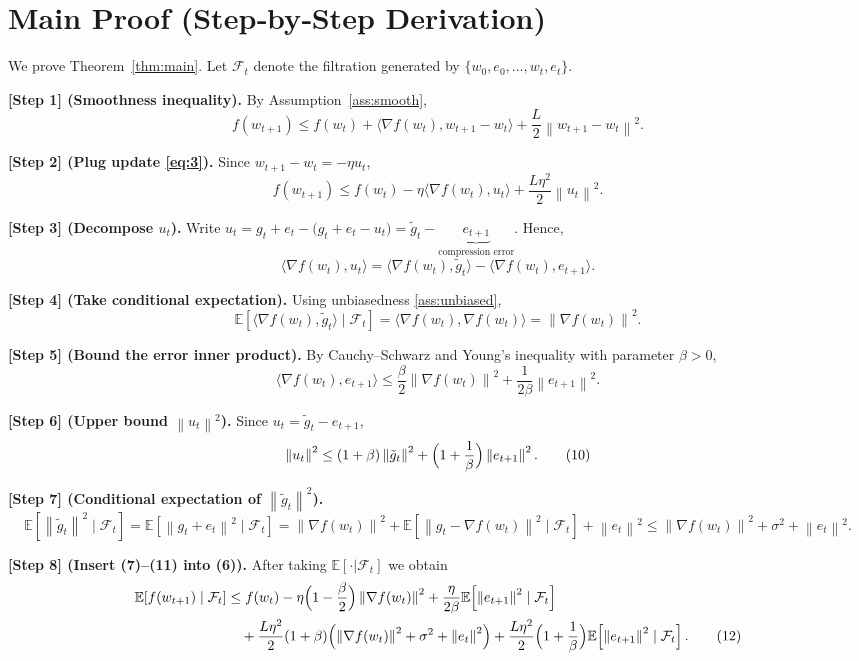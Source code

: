\documentclass{article}
\newcommand{\E}{\mathbb{E}}
\newcommand{\norm}[1]{\left\|#1\right\|}
\begin{document}
\section*{Main Proof (Step‑by‑Step Derivation)}
We prove Theorem~\ref{thm:main}. Let $\mathcal{F}_{t}$ denote the filtration generated by $\{w_{0},e_{0},\dots,w_{t},e_{t}\}$.

\noindent\textbf{[Step 1] (Smoothness inequality).} By Assumption~\ref{ass:smooth},
\[
f(w_{t+1})\le f(w_{t})+\langle\nabla f(w_{t}),w_{t+1}-w_{t}\rangle+\frac{L}{2}\norm{w_{t+1}-w_{t}}^{2}. \tag{5}
\]

\noindent\textbf{[Step 2] (Plug update \eqref{eq:3}).} Since $w_{t+1}-w_{t}=-\eta u_{t}$,
\[
f(w_{t+1})\le f(w_{t})-\eta\langle\nabla f(w_{t}),u_{t}\rangle+\frac{L\eta^{2}}{2}\norm{u_{t}}^{2}. \tag{6}
\]

\noindent\textbf{[Step 3] (Decompose $u_{t}$).} Write $u_{t}=g_{t}+e_{t}-\bigl(g_{t}+e_{t}-u_{t}\bigr)=\tilde g_{t}-\underbrace{e_{t+1}}_{\text{compression error}}$.
Hence,
\[
\langle\nabla f(w_{t}),u_{t}\rangle
= \langle\nabla f(w_{t}),\tilde g_{t}\rangle-\langle\nabla f(w_{t}),e_{t+1}\rangle.
\tag{7}
\]

\noindent\textbf{[Step 4] (Take conditional expectation).} Using unbiasedness \eqref{ass:unbiased},
\[
\E\!\left[\langle\nabla f(w_{t}),\tilde g_{t}\rangle\mid\mathcal{F}_{t}\right]
= \langle\nabla f(w_{t}),\nabla f(w_{t})\rangle
= \norm{\nabla f(w_{t})}^{2}. \tag{8}
\]

\noindent\textbf{[Step 5] (Bound the error inner product).} By Cauchy–Schwarz and Young’s inequality with parameter $\beta>0$,
\[
\langle\nabla f(w_{t}),e_{t+1}\rangle\le \frac{\beta}{2}\norm{\nabla f(w_{t})}^{2}
+\frac{1}{2\beta}\norm{e_{t+1}}^{2}. \tag{9}
\]

\noindent\textbf{[Step 6] (Upper bound $\norm{u_{t}}^{2}$).} Since $u_{t}=\tilde g_{t}-e_{t+1}$,
\[
\norm{u_{t}}^{2}\le (1+\beta)\norm{\tilde g_{t}}^{2}+\Bigl(1+\frac{1}{\beta}\Bigr)\norm{e_{t+1}}^{2}. \tag{10}
\]

\noindent\textbf{[Step 7] (Conditional expectation of $\norm{\tilde g_{t}}^{2}$).}
\[
\E\!\left[\norm{\tilde g_{t}}^{2}\mid\mathcal{F}_{t}\right]
= \E\!\left[\norm{g_{t}+e_{t}}^{2}\mid\mathcal{F}_{t}\right]
= \norm{\nabla f(w_{t})}^{2}+\E\!\left[\norm{g_{t}-\nabla f(w_{t})}^{2}\mid\mathcal{F}_{t}\right]
+\norm{e_{t}}^{2}
\le \norm{\nabla f(w_{t})}^{2}+\sigma^{2}+\norm{e_{t}}^{2}. \tag{11}
\]

\noindent\textbf{[Step 8] (Insert (7)–(11) into (6)).} After taking $\E[\cdot|\mathcal{F}_{t}]$ we obtain
\begin{align}
\E\!\left[f(w_{t+1})\mid\mathcal{F}_{t}\right]
&\le f(w_{t})-\eta\Bigl(1-\frac{\beta}{2}\Bigr)\norm{\nabla f(w_{t})}^{2}
+\frac{\eta}{2\beta}\E\!\left[\norm{e_{t+1}}^{2}\mid\mathcal{F}_{t}\right]\nonumber\\
&\quad+\frac{L\eta^{2}}{2}(1+\beta)\Bigl(\norm{\nabla f(w_{t})}^{2}+\sigma^{2}+\norm{e_{t}}^{2}\Bigr)
+\frac{L\eta^{2}}{2}\Bigl(1+\frac{1}{\beta}\Bigr)\E\!\left[\norm{e_{t+1}}^{2}\mid\mathcal{F}_{t}\right].
\tag{12}
\end{align}
\end{document}

